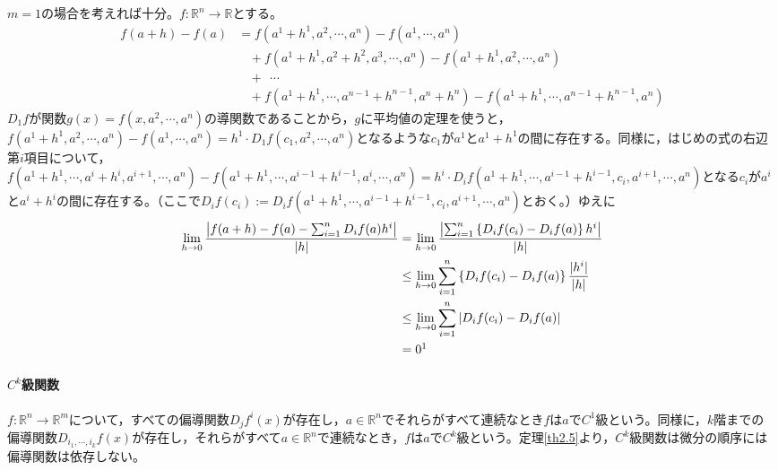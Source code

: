 \documentclass[dvipdfmx,a4j,10pt]{jsarticle}
\makeatletter
\theoremstyle{mystyle1}
\theoremstyle{mystyle2}
\renewenvironment{proof}[1][\proofname]{\par
  \pushQED{\qed}%
  \normalfont
  \topsep6\p@\@plus6\p@ \trivlist
  \item[\hskip\labelsep{\bfseries\sffamily #1}]\ignorespaces
}{%
  \popQED\endtrivlist\@endpefalse
}
\renewcommand\proofname{証明}
\makeatother
\begin{document}
\begin{proof}
	$m=1$の場合を考えれば十分\footnotemark。$f:\mathbb{R}^n\to\mathbb{R}$とする。
	\[
	\begin{split}
	f(a+h)-f(a)&=f(a^1+h^1,a^2,\cdots,a^n)-f(a^1,\cdots,a^n)\\
	&\ \ \ \ +f(a^1+h^1,a^2+h^2,a^3,\cdots,a^n)-f(a^1+h^1,a^2,\cdots,a^n)\\
	&\ \ \ \ +\ \ \cdots \\
	&\ \ \ \ +f(a^1+h^1,\cdots,a^{n-1}+h^{n-1},a^n+h^n)-f(a^1+h^1,\cdots,a^{n-1}+h^{n-1},a^n)
	\end{split}
	\]
	$D_1f$が関数$g(x)=f(x,a^2,\cdots,a^n)$の導関数であることから，$g$に平均値の定理を使うと，$f(a^1+h^1,a^2,\cdots,a^n)-f(a^1,\cdots,a^n)=h^1\cdot D_1f(c_1,a^2,\cdots,a^n)$となるような$c_1$が$a^1$と$a^1+h^1$の間に存在する。同様に，はじめの式の右辺第$i$項目について，$f(a^1+h^1,\cdots,a^i+h^i,a^{i+1},\cdots,a^n)-f(a^1+h^1,\cdots,a^{i-1}+h^{i-1},a^i,\cdots,a^n)=h^i\cdot D_if(a^1+h^1,\cdots,a^{i-1}+h^{i-1},c_i,a^{i+1},\cdots,a^n)$となる$c_i$が$a^i$と$a^i+h^i$の間に存在する。（ここで$D_if(c_i):= D_if(a^1+h^1,\cdots,a^{i-1}+h^{i-1},c_i,a^{i+1},\cdots,a^n)$とおく。）ゆえに
	\[
	\begin{split}
		\lim_{h\to0}\frac{\left|f(a+h)-f(a)-\sum_{i=1}^nD_if(a)h^i\right|}{|h|}
		&=\lim_{h\to0}\frac{\left|\sum_{i=1}^n\left\{D_if(c_i)-D_if(a)\right\}h^i\right|}{|h|}\\
		&\leq\lim_{h\to0}\sum_{i=1}^n\left\{D_if(c_i)-D_if(a)\right\}\frac{|h^i|}{|h|}\\
		&\leq\lim_{h\to0}\sum_{i=1}^n|D_if(c_i)-D_if(a)|\\
		&=0\footnotemark
	\end{split}
	\]
\end{proof}


\paragraph{$C^k$級関数}
$f:\mathbb{R}^n\to\mathbb{R}^m$について，すべての偏導関数$D_jf^i(x)$が存在し，$a\in\mathbb{R}^n$でそれらがすべて連続なとき$f$は$a$で$C^1$級という。同様に，$k$階までの　偏導関数$D_{i_1,\cdots,i_k}f(x)$が存在し，それらがすべて$a\in\mathbb{R}^n$で連続なとき，$f$は$a$で$C^k$級という。定理\ref{th2.5}より，$C^k$級関数は微分の順序には偏導関数は依存しない。
\end{document}
